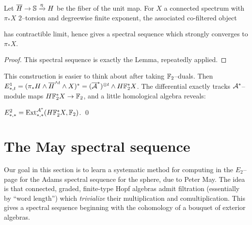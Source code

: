 \begin{theorem}
Let $\overline H \to \S \xrightarrow \eta H$ be the fiber of the unit map.
For $X$ a connected spectrum with $\pi_* X$ $2$--torsion and degreewise finite exponent, the associated co-filtered object
\begin{center}
\end{center}
has contractible limit, hence gives a spectral sequence which strongly converges to $\pi_* X$.
\end{theorem}
\begin{proof}
This spectral sequence is exactly the Lemma, repeatedly applied.
\end{proof}

This construction is easier to think about after taking $\F_2$--duals.  Then $E^1_{*, t} = (\pi_* H \sm \overline H^{\sm t} \sm X)^* = (\overline{\A}^*)^{\otimes t} \sm H\F_2^* X$.  The differential exactly tracks $\A^*$--module maps $H\F_2^* X \to \F_2$, and a little homological algebra reveals:
\begin{lemma}
$E^2_{*, *} = \Ext^{\A^*}_{*, *}(H\F_2^* X, \F_2)$. \qed
\end{lemma}

\begin{remark}
\end{remark}





\section{The May spectral sequence}

Our goal in this section is to learn a systematic method for computing in the $E_2$--page for the Adams spectral sequence for the sphere, due to Peter May.
The idea is that connected, graded, finite-type Hopf algebras admit filtration (essentially by ``word length'') which \emph{trivialize} their multiplication and comultiplication.
This gives a spectral sequence beginning with the cohomology of a bouquet of exterior algebras.

